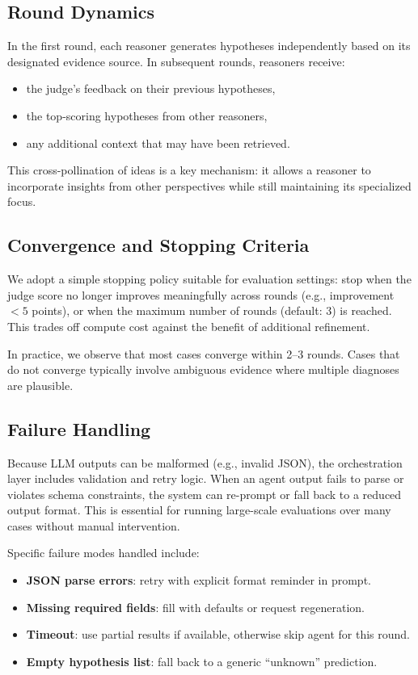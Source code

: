 \subsection{Round Dynamics}
In the first round, each reasoner generates hypotheses independently based on its designated
evidence source. In subsequent rounds, reasoners receive:
\begin{itemize}
  \item the judge's feedback on their previous hypotheses,
  \item the top-scoring hypotheses from other reasoners,
  \item any additional context that may have been retrieved.
\end{itemize}
This cross-pollination of ideas is a key mechanism: it allows a reasoner to incorporate insights
from other perspectives while still maintaining its specialized focus.

\subsection{Convergence and Stopping Criteria}
We adopt a simple stopping policy suitable for evaluation settings: stop when the judge score no
longer improves meaningfully across rounds (e.g., improvement~$< 5$ points), or when the maximum
number of rounds (default: 3) is reached. This trades off compute cost against the benefit of
additional refinement.

In practice, we observe that most cases converge within 2--3 rounds. Cases that do not converge
typically involve ambiguous evidence where multiple diagnoses are plausible.

\subsection{Failure Handling}
Because LLM outputs can be malformed (e.g., invalid JSON), the orchestration layer includes
validation and retry logic. When an agent output fails to parse or violates schema constraints,
the system can re-prompt or fall back to a reduced output format. This is essential for running
large-scale evaluations over many cases without manual intervention.

Specific failure modes handled include:
\begin{itemize}
  \item \textbf{JSON parse errors}: retry with explicit format reminder in prompt.
  \item \textbf{Missing required fields}: fill with defaults or request regeneration.
  \item \textbf{Timeout}: use partial results if available, otherwise skip agent for this round.
  \item \textbf{Empty hypothesis list}: fall back to a generic ``unknown'' prediction.
\end{itemize}

